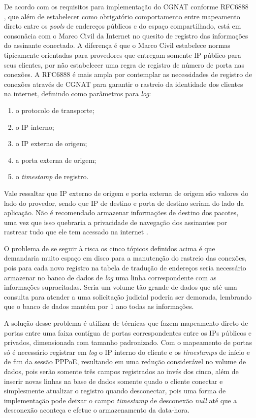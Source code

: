    De acordo com os requisitos para implementação do CGNAT conforme RFC6888 \cite{rfc6888}, que além de estabelecer como obrigatório comportamento entre mapeamento direto entre os \textit{pools} de endereços públicos e do espaço compartilhado, está em consonâcia com o Marco Civil da Internet no quesito de registro das informações do assinante conectado. A diferença é que o Marco Civil estabelece normas tipicamente orientadas para provedores que entregam somente IP público para seus clientes, por não estabelecer uma regra de registro de número de porta nas conexões. A RFC6888 é mais ampla por contemplar as necessidades de registro de conexões através de CGNAT para garantir o rastreio da identidade dos clientes na internet, definindo como parâmetros para \textit{log}:
   
   \begin{enumerate}[label=\alph*)]
       \item o protocolo de transporte;
       \item o IP interno;
       \item o IP externo de origem;
       \item a porta externa de origem;
       \item o \textit{timestamp} de registro.
   \end{enumerate}

   Vale ressaltar que IP externo de origem e porta externa de origem são valores do lado do provedor, sendo que IP de destino e porta de destino seriam do lado da aplicação. Não é recomendado armazenar informações de destino dos pacotes, uma vez que isso quebraria a privacidade de navegação dos assinantes por rastrear tudo que ele tem acessado na internet \cite{rfc6888}.

   O problema de se seguir à risca os cinco tópicos definidos acima é que demandaria muito espaço em disco para a manutenção do rastreio das conexões, pois para cada novo registro na tabela de tradução de endereços seria necessário armazenar no banco de dados de \textit{log} uma linha correspondente com as informações supracitadas. Seria um volume tão grande de dados que até uma consulta para atender a uma solicitação judicial poderia ser demorada, lembrando que o banco de dados mantém por 1 ano todas as informações.

   A solução desse problema é utilizar de técnicas que fazem mapeamento direto de portas entre uma faixa contígua de portas correspondentes entre os IPs públicos e privados, dimensionada com tamanho padronizado. Com o mapeamento de portas só é necessário registrar em \textit{log} o IP interno do cliente e os \textit{timestamps} de início e de fim da sessão PPPoE, resultando em uma redução considerável no volume de dados, pois serão somente três campos registrados ao invés dos cinco, além de inserir novas linhas na base de dados somente quado o cliente conectar e simplesmente atualizar o registro quando desconectar, pois uma forma de implementação pode deixar o campo \textit{timestamp} de desconexão \textit{null} até que a desconexão aconteça e efetue o armazenamento da data-hora.

